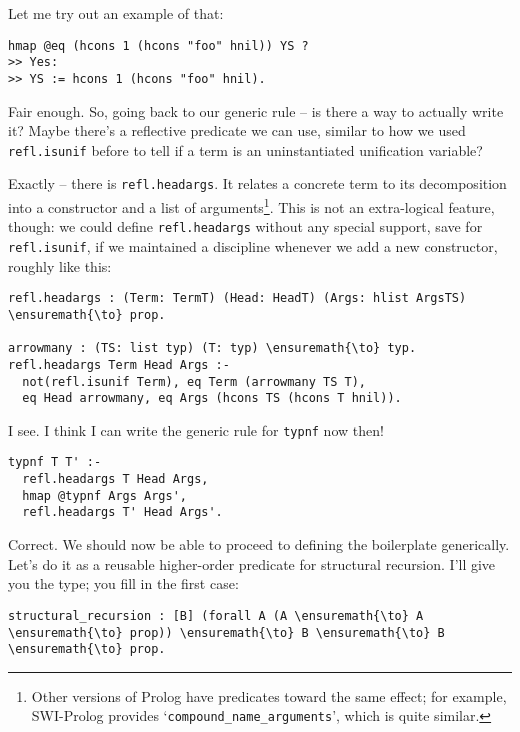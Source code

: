 \heroSTUDENT{} Let me try out an example of that:

\begin{verbatim}
hmap @eq (hcons 1 (hcons "foo" hnil)) YS ?
>> Yes:
>> YS := hcons 1 (hcons "foo" hnil).
\end{verbatim}

\heroSTUDENT{} Fair enough. So, going back to our generic rule -- is there a
way to actually write it? Maybe there's a reflective predicate we can
use, similar to how we used \texttt{refl.isunif} before to tell if a
term is an uninstantiated unification variable?

\heroADVISOR{} Exactly -- there is \texttt{refl.headargs}. It relates a
concrete term to its decomposition into a constructor and a list of
arguments\footnote{Other versions of Prolog have predicates toward the same effect; for example, SWI-Prolog \citep{wielemaker2012swi} provides `\texttt{compound\_{}name\_{}arguments}', which is quite similar.}.
This is not an extra-logical feature, though: we could define
\texttt{refl.headargs} without any special support, save for
\texttt{refl.isunif}, if we maintained a discipline whenever we add a
new constructor, roughly like this:

\begin{verbatim}
refl.headargs : (Term: TermT) (Head: HeadT) (Args: hlist ArgsTS) \ensuremath{\to} prop.

arrowmany : (TS: list typ) (T: typ) \ensuremath{\to} typ.
refl.headargs Term Head Args :-
  not(refl.isunif Term), eq Term (arrowmany TS T),
  eq Head arrowmany, eq Args (hcons TS (hcons T hnil)).
\end{verbatim}

\heroSTUDENT{} I see. I think I can write the generic rule for \texttt{typnf}
now then!

\begin{verbatim}
typnf T T' :-
  refl.headargs T Head Args,
  hmap @typnf Args Args',
  refl.headargs T' Head Args'.
\end{verbatim}

\heroADVISOR{} Correct. We should now be able to proceed to defining the
boilerplate generically. Let's do it as a reusable higher-order
predicate for structural recursion. I'll give you the type; you fill in
the first case:

\begin{verbatim}
structural_recursion : [B] (forall A (A \ensuremath{\to} A \ensuremath{\to} prop)) \ensuremath{\to} B \ensuremath{\to} B \ensuremath{\to} prop.
\end{verbatim}

